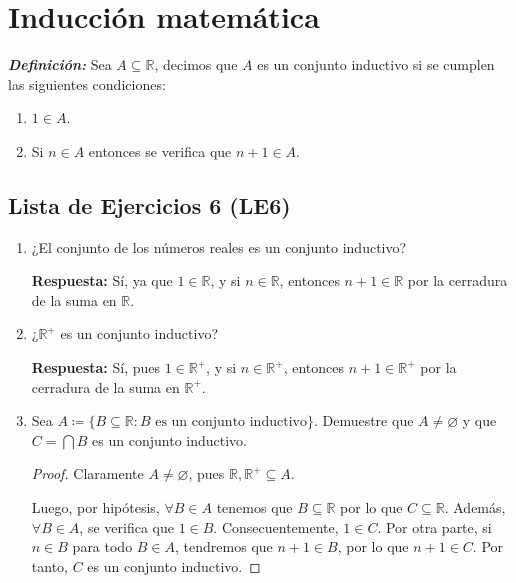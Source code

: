 \documentclass[11pt]{article}
\newcommand{\R}{\mathbb{R}}
\newcommand{\bfit}[1]{\textbf{\textit{#1}}}
\let\emptyset\varnothing
\let\subset\subseteq
\begin{document}
\pagebreak

\section*{Inducción matemática}

\bfit{Definición:}  Sea $A\subset \R$, decimos que $A$ es un conjunto inductivo si se cumplen las siguientes condiciones:
    \begin{enumerate}[label=\roman*)]
        \item $1 \in A$.
        \item Si $n \in A$ entonces se verifica que $n+1 \in A$.
    \end{enumerate}

\subsection*{Lista de Ejercicios 6 (LE6)}

\begin{enumerate}[label=\arabic*)]
    \item ¿El conjunto de los números reales es un conjunto inductivo?
    
    \textbf{Respuesta:} Sí, ya que $1 \in \R$, y si $n\in \R$, entonces $n+1 \in \R$ por la cerradura de la suma en $\R$.


    \item ¿$\R^+$ es un conjunto inductivo?
    
    \textbf{Respuesta:} Sí, pues $1\in \R^+$, y si $n\in \R^+$, entonces $n+1 \in \R^+$ por la cerradura de la suma en $\R^+$.

    \item Sea $A\coloneqq \{B \subseteq \R: B \text{ es un conjunto inductivo}\}$. Demuestre que $A\neq \emptyset$ y que $C=\bigcap B$ es un conjunto inductivo.
    
    \vspace{-1em}\begin{proof} 
    Claramente $A \neq \emptyset$, pues $\R, \R^+ \subseteq A$.
    
    Luego, por hipótesis, $\forall B \in A$ tenemos que $B\subseteq \R $ por lo que $C\subseteq \R$. Además, $\forall B\in A$, se verifica que $1\in B$. Consecuentemente, $1\in C$. Por otra parte, si $n\in B$ para todo $B\in A$, tendremos que $n+1\in B$, por lo que $n+1 \in C$. Por tanto, $C$ es un conjunto inductivo.
    \end{proof} \vspace{-1em}
\end{enumerate}
\end{document}
